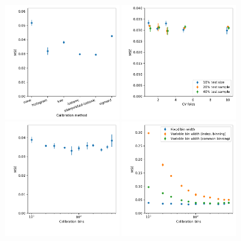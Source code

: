 \begin{figure}
  \includegraphics[width=0.45\textwidth]{figures/appendix/pointwise_tuning_full/mse_full_calibration_method.pdf}%
  \includegraphics[width=0.45\textwidth]{figures/appendix/pointwise_tuning_full/mse_full_cv_folds.pdf}\\%
  \includegraphics[width=0.45\textwidth]{figures/appendix/pointwise_tuning_full/mse_full_calibration_bins.pdf}%
  \includegraphics[width=0.45\textwidth]{figures/appendix/pointwise_tuning_full/mse_full_calibration_bins_variable.pdf}%

\end{figure}
